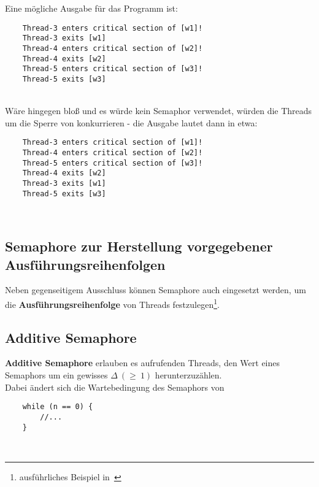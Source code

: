 \newpage
Eine mögliche Ausgabe für das Programm ist:\\

\noindent
\begin{verbatim}
    Thread-3 enters critical section of [w1]!
    Thread-3 exits [w1]
    Thread-4 enters critical section of [w2]!
    Thread-4 exits [w2]
    Thread-5 enters critical section of [w3]!
    Thread-5 exits [w3]
\end{verbatim}\\

\noindent
Wäre  hingegen bloß  und es würde kein Semaphor verwendet, würden die Threads um die Sperre von  konkurrieren - die Ausgabe lautet dann in etwa:


\begin{verbatim}
    Thread-3 enters critical section of [w1]!
    Thread-4 enters critical section of [w2]!
    Thread-5 enters critical section of [w3]!
    Thread-4 exits [w2]
    Thread-3 exits [w1]
    Thread-5 exits [w3]
\end{verbatim}\\

\subsection{Semaphore zur Herstellung vorgegebener Ausführungsreihenfolgen}

Neben gegenseitigem Ausschluss können Semaphore auch eingesetzt werden, um die \textbf{Ausführungsreihenfolge} von Threads festzulegen\footnote{ausführliches Beispiel in~\cite[104]{Oec22}}.

\subsection{Additive Semaphore}
\textbf{Additive Semaphore} erlauben es aufrufenden Threads, den Wert eines Semaphors um ein gewisses $\Delta\ (\geq\ 1)$ herunterzuzählen.\\

\noindent
Dabei ändert sich die Wartebedingung des Semaphors von

\begin{verbatim}
    while (n == 0) {
        //...
    }
\end{verbatim}\\

